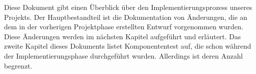 Diese Dokument gibt einen Überblick über den Implementierungsprozess unseres Projekts. Der Hauptbestandteil ist die Dokumentation von Änderungen, die an dem in der vorherigen Projektphase erstellten Entwurf vorgenommen wurden.
 Diese Änderungen werden im nächsten Kapitel aufgeführt und erläutert.
 Das zweite Kapitel dieses Dokuments listet Komponententest auf, die schon während der Implementierungsphase durchgeführt wurden. Allerdings ist deren Anzahl begrenzt.